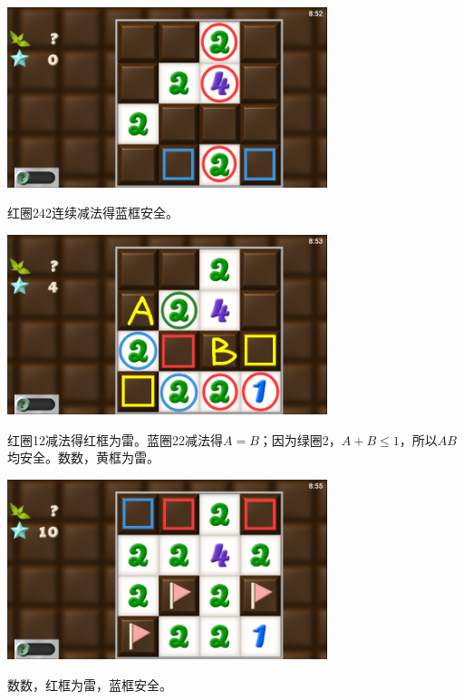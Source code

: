 \subsection{} %
\begin{center}
    \includegraphics[width=0.7\textwidth]{puzzle/113-1.png}
\end{center}
红圈242连续减法得蓝框安全。
\begin{center}
    \includegraphics[width=0.7\textwidth]{puzzle/113-2.png}
\end{center}
红圈12减法得红框为雷。蓝圈22减法得$A=B$；因为绿圈2，$A+B\le 1$，所以$AB$均安全。数数，黄框为雷。
\begin{center}
    \includegraphics[width=0.7\textwidth]{puzzle/113-3.png}
\end{center}
数数，红框为雷，蓝框安全。

